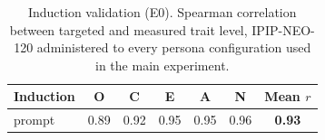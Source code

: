 \begin{table}[t]\centering
\small
\caption{Induction validation (E0). Spearman correlation between targeted and measured trait level, IPIP-NEO-120 administered to every persona configuration used in the main experiment.}
\label{tab:e0}
\begin{tabular}{lcccccc}
\toprule
Induction & O & C & E & A & N & Mean $r$ \\
\midrule
prompt & 0.89 & 0.92 & 0.95 & 0.95 & 0.96 & \textbf{0.93} \\
\bottomrule
\end{tabular}
\end{table}
